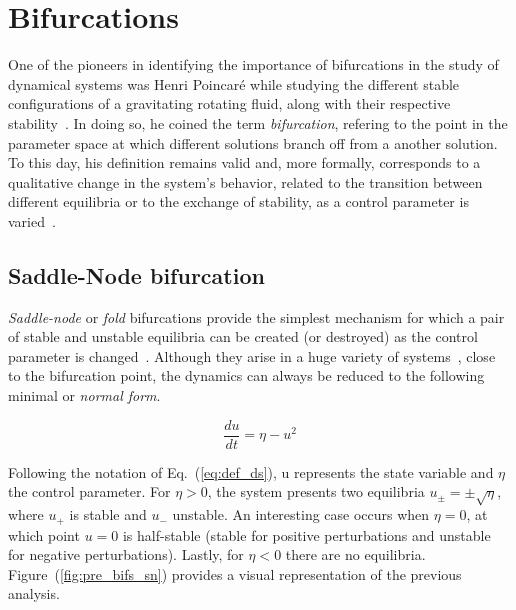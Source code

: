 \section{Bifurcations}

One of the pioneers in identifying the importance of bifurcations in the study of dynamical systems
was Henri Poincaré while studying the different stable
configurations of a gravitating rotating fluid, along with their respective stability~\cite{poincare1885equilibre}. 
In doing so, he coined the
term {\em bifurcation}, refering to the point in the parameter space at which different solutions branch off from a another solution.
To this day, his definition remains valid and, more formally, corresponds to a qualitative change 
in the system's behavior, related to the transition between different equilibria or to the exchange of stability,
as a control parameter is varied~\cite{strogatz2018nonlinear}.



\subsection{Saddle-Node bifurcation}

{\em Saddle-node} or {\em fold} bifurcations provide the simplest mechanism 
for which a pair of stable and unstable equilibria can be created (or destroyed) 
as the control parameter is changed~\cite{strogatz2018nonlinear}. Although they 
arise in a huge variety of systems~\cite{Jackson_1989}, close to the bifurcation 
point, the dynamics can always be reduced to
the following minimal or {\em normal form}.

\begin{equation}
    \dfrac{du}{dt} = \eta - u^2
    \label{eq:pre_bif_sn}
\end{equation}

Following the notation of Eq.~(\ref{eq:def_ds}), u represents the state variable
and $\eta$ the control parameter. For $\eta > 0$, the system presents two equilibria $u_{\pm} = \pm\sqrt{\eta}$, where $u_+$ is
stable and $u_-$ unstable. An interesting case occurs when $\eta = 0$, at which point $u = 0$ is
half-stable (stable for positive perturbations and unstable for negative perturbations). Lastly,
for $\eta < 0$ there are no equilibria. Figure~(\ref{fig:pre_bifs_sn}) provides a visual representation
of the previous analysis.


